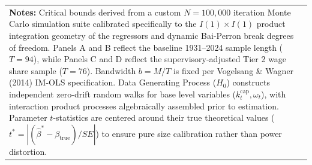\begin{table}[H]
\begin{tabular}{p{4.2cm} p{2.6cm} p{2.2cm} p{2.2cm} p{2.2cm}}
		\bottomrule
		\multicolumn{5}{p{14.2cm}}{\footnotesize \textbf{Notes:} Critical bounds derived from a custom $N=100,000$ iteration Monte Carlo simulation suite calibrated specifically to the $I(1) \times I(1)$ product integration geometry of the regressors and dynamic Bai-Perron break degrees of freedom. Panels A and B reflect the baseline 1931--2024 sample length ($T=94$), while Panels C and D reflect the supervisory-adjusted Tier 2 wage share sample ($T=76$). Bandwidth $b = M/T$ is fixed per Vogelsang \& Wagner (2014) IM-OLS specification. Data Generating Process ($H_0$) constructs independent zero-drift random walks for base level variables ($k_t^{\text{cap}}, \omega_t$), with interaction product processes algebraically assembled prior to estimation. Parameter $t$-statistics are centered around their true theoretical values ($t^* = |(\hat{\beta}^* - \beta_{\text{true}})/SE|$) to ensure pure size calibration rather than power distortion.} \\
	\end{tabular}
\end{table}


